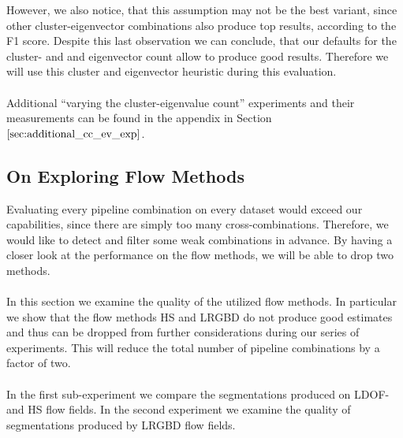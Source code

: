 However, we also notice, that this assumption may not be the best variant, since other cluster-eigenvector combinations also produce top results, according to the F1 score. Despite this last observation we can conclude, that our defaults for the cluster- and and eigenvector count allow to produce good results. Therefore we will use this cluster and eigenvector heuristic during this evaluation. \\ \\
Additional \enquote{varying the cluster-eigenvalue count} experiments and their measurements can be found in the appendix in Section $\ref{sec:additional_cc_ev_exp}$.

\subsection{On Exploring Flow Methods}
\label{sec:flow_methods}
Evaluating every pipeline combination on every dataset would exceed our capabilities, since there are simply too many cross-combinations. Therefore, we would like to detect and filter some weak combinations in advance. By having a closer look at the performance on the flow methods, we will be able to drop two methods. \\ \\
In this section we examine the quality of the utilized flow methods. In particular we show that the flow methods HS and LRGBD do not produce good estimates and thus can be dropped from further considerations during our series of experiments. This will reduce the total number of pipeline combinations by a factor of two. \\ \\
In the first sub-experiment we compare the segmentations produced on LDOF-and HS flow fields. In the second experiment we examine the quality of segmentations produced by LRGBD flow fields.

